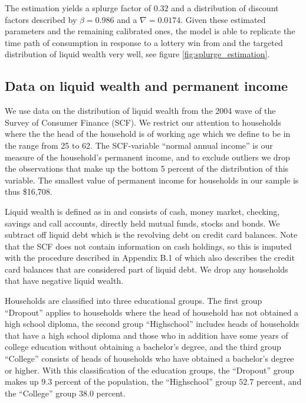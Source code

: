 \documentclass[11pt]{article}
\begin{document}
The estimation yields a splurge factor of $0.32$ and a distribution of discount factors described by $\beta = 0.986$ and a $\nabla=0.0174$. Given these estimated parameters and the remaining calibrated ones, the model is able to replicate the time path of consumption in response to a lottery win from \citet{fagereng_mpc_2021} and the targeted distribution of liquid wealth very well, see figure \ref{fig:splurge_estimation}.


\subsection{Data on liquid wealth and permanent income}
\label{sec:estimData}

We use data on the distribution of liquid wealth from the 2004 wave of the Survey of Consumer Finance (SCF). We restrict our attention to households where the the head of the household is of working age which we define to be in the range from 25 to 62. The SCF-variable ``normal annual income'' is our measure of the household's permanent income, and to exclude outliers we drop the observations that make up the bottom 5 percent of the distribution of this variable. The smallest value of permanent income for households in our sample is thus \$16,708. 

Liquid wealth is defined as in \citet{kaplan2014model} and consists of cash, money market, checking, savings and call accounts, directly held mutual funds, stocks and bonds. We subtract off liquid debt which is the revolving debt on credit card balances. Note that the SCF does not contain information on cash holdings, so this is imputed with the procedure described in Appendix B.1 of \citet{kaplan2014model} which also describes the credit card balances that are considered part of liquid debt. We drop any households that have negative liquid wealth. 

Households are classified into three educational groups. The first group ``Dropout'' applies to households where the head of household has not obtained a high school diploma, the second group ``Highschool'' includes heads of households that have a high school diploma and those who in addition  have some years of college education without obtaining a bachelor's degree, and the third group ``College'' consists of heads of households who have obtained a bachelor's degree or higher. With this classification of the education groups, the ``Dropout'' group makes up $9.3$ percent of the population, the ``Highschool'' group $52.7$ percent, and the ``College'' group $38.0$ percent. 
\end{document}
